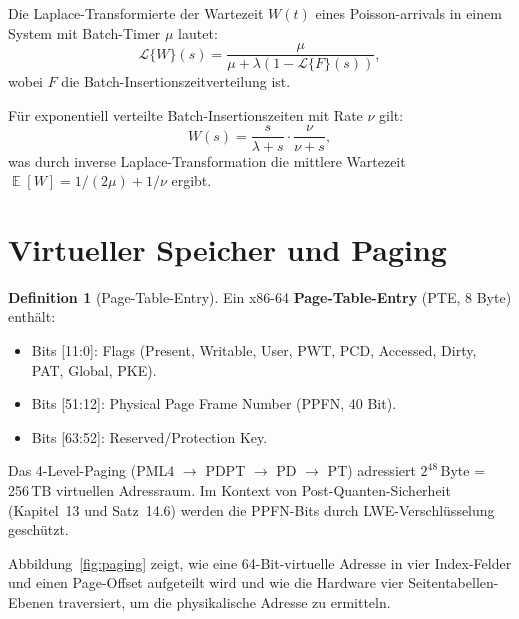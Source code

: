 ﻿\documentclass[a4paper,12pt]{scrreprt}
\theoremstyle{definition}
\newtheorem{definition}{Definition}[chapter]
\DeclareMathOperator{\E}{\mathbb{E}}
\begin{document}
	Die Laplace-Transformierte der Wartezeit $W(t)$ eines Poisson-arrivals
	in einem System mit Batch-Timer $\mu$ lautet:
	\[
	\mathcal{L}\{W\}(s) = \frac{\mu}{\mu + \lambda(1 - \mathcal{L}\{F\}(s))},
	\]
	wobei $F$ die Batch-Insertionszeitverteilung ist.
	
	Für exponentiell verteilte Batch-Insertionszeiten mit Rate $\nu$ gilt:
	\[
	W(s) = \frac{s}{\lambda + s} \cdot \frac{\nu}{\nu + s},
	\]
	was durch inverse Laplace-Transformation die mittlere Wartezeit
	$\E[W] = 1/(2\mu) + 1/\nu$ ergibt.
	
	\section{Virtueller Speicher und Paging}

	\begin{definition}[Page-Table-Entry]
		Ein x86-64 \textbf{Page-Table-Entry} (PTE, 8 Byte) enthält:
		\begin{itemize}
			\item Bits [11:0]: Flags (Present, Writable, User, PWT, PCD, Accessed,
			Dirty, PAT, Global, PKE).
			\item Bits [51:12]: Physical Page Frame Number (PPFN, 40 Bit).
			\item Bits [63:52]: Reserved/Protection Key.
		\end{itemize}
	\end{definition}

	Das 4-Level-Paging (PML4 $\to$ PDPT $\to$ PD $\to$ PT) adressiert
	$2^{48}$\,Byte = 256\,TB virtuellen Adressraum. Im Kontext von
	Post-Quanten-Sicherheit (Kapitel~13 und Satz~14.6) werden die PPFN-Bits
	durch LWE-Verschlüsselung geschützt.

	Abbildung~\ref{fig:paging} zeigt, wie eine 64-Bit-virtuelle Adresse in
	vier Index-Felder und einen Page-Offset aufgeteilt wird und wie die
	Hardware vier Seitentabellen-Ebenen traversiert, um die physikalische
	Adresse zu ermitteln.
\end{document}
